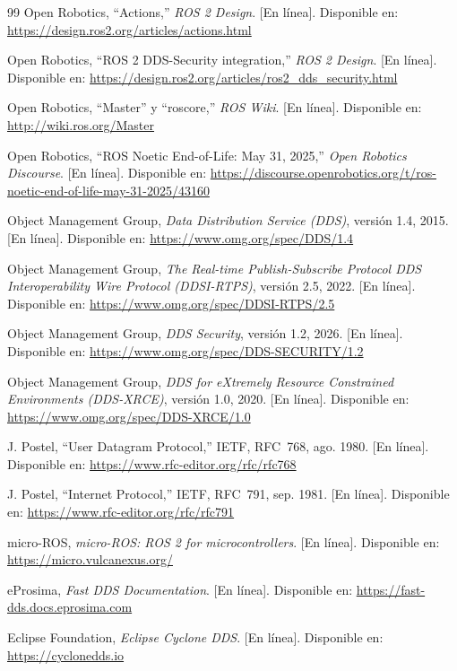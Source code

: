 \documentclass[DOC]{UTNLSE}
\begin{document}
\begin{thebibliography}{99}
Open Robotics, ``Actions,'' \emph{ROS 2 Design}. [En línea]. Disponible en:
\url{https://design.ros2.org/articles/actions.html}

Open Robotics, ``ROS 2 DDS-Security integration,'' \emph{ROS 2 Design}.
[En línea]. Disponible en:
\url{https://design.ros2.org/articles/ros2_dds_security.html}

Open Robotics, ``Master'' y ``roscore,'' \emph{ROS Wiki}. [En línea].
Disponible en: \url{http://wiki.ros.org/Master}

Open Robotics, ``ROS Noetic End-of-Life: May 31, 2025,'' \emph{Open Robotics
Discourse}. [En línea]. Disponible en:
\url{https://discourse.openrobotics.org/t/ros-noetic-end-of-life-may-31-2025/43160}

Object Management Group, \emph{Data Distribution Service (DDS)}, versión 1.4,
2015. [En línea]. Disponible en: \url{https://www.omg.org/spec/DDS/1.4}

Object Management Group, \emph{The Real-time Publish-Subscribe Protocol DDS
Interoperability Wire Protocol (DDSI-RTPS)}, versión 2.5, 2022. [En línea].
Disponible en: \url{https://www.omg.org/spec/DDSI-RTPS/2.5}

Object Management Group, \emph{DDS Security}, versión 1.2, 2026. [En línea].
Disponible en: \url{https://www.omg.org/spec/DDS-SECURITY/1.2}

Object Management Group, \emph{DDS for eXtremely Resource Constrained
Environments (DDS-XRCE)}, versión 1.0, 2020. [En línea]. Disponible en:
\url{https://www.omg.org/spec/DDS-XRCE/1.0}

J. Postel, ``User Datagram Protocol,'' IETF, RFC~768, ago. 1980. [En línea].
Disponible en: \url{https://www.rfc-editor.org/rfc/rfc768}

J. Postel, ``Internet Protocol,'' IETF, RFC~791, sep. 1981. [En línea].
Disponible en: \url{https://www.rfc-editor.org/rfc/rfc791}

micro-ROS, \emph{micro-ROS: ROS 2 for microcontrollers}. [En línea].
Disponible en: \url{https://micro.vulcanexus.org/}

eProsima, \emph{Fast DDS Documentation}. [En línea]. Disponible en:
\url{https://fast-dds.docs.eprosima.com}

Eclipse Foundation, \emph{Eclipse Cyclone DDS}. [En línea]. Disponible en:
\url{https://cyclonedds.io}


\end{thebibliography}
\end{document}
